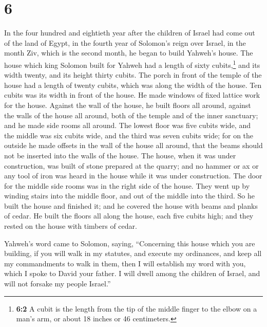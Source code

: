 \hypertarget{section-5}{%
\section{6}\label{section-5}}

 In the four hundred and eightieth year after the children
of Israel had come out of the land of Egypt, in the fourth year of
Solomon's reign over Israel, in the month Ziv, which is the second
month, he began to build Yahweh's house.  The house which
king Solomon built for Yahweh had a length of sixty cubits,\footnote{\textbf{6:2}
  A cubit is the length from the tip of the middle finger to the elbow
  on a man's arm, or about 18 inches or 46 centimeters.} and its width
twenty, and its height thirty cubits.  The porch in front
of the temple of the house had a length of twenty cubits, which was
along the width of the house. Ten cubits was its width in front of the
house.  He made windows of fixed lattice work for the
house.  Against the wall of the house, he built floors all
around, against the walls of the house all around, both of the temple
and of the inner sanctuary; and he made side rooms all around.
 The lowest floor was five cubits wide, and the middle was
six cubits wide, and the third was seven cubits wide; for on the outside
he made offsets in the wall of the house all around, that the beams
should not be inserted into the walls of the house.  The
house, when it was under construction, was built of stone prepared at
the quarry; and no hammer or ax or any tool of iron was heard in the
house while it was under construction.  The door for the
middle side rooms was in the right side of the house. They went up by
winding stairs into the middle floor, and out of the middle into the
third.  So he built the house and finished it; and he
covered the house with beams and planks of cedar.  He
built the floors all along the house, each five cubits high; and they
rested on the house with timbers of cedar.

 Yahweh's word came to Solomon, saying, 
``Concerning this house which you are building, if you will walk in my
statutes, and execute my ordinances, and keep all my commandments to
walk in them, then I will establish my word with you, which I spoke to
David your father.  I will dwell among the children of
Israel, and will not forsake my people Israel.''

